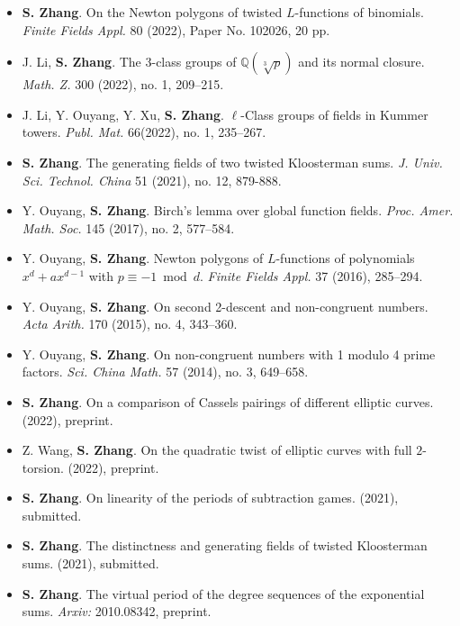 \documentclass[11pt,a4paper]{article}
\begin{document}
\begin{itemize}
\item \textbf{S. Zhang}.
On the Newton polygons of twisted $L$-functions of binomials.
{\em Finite Fields Appl.} 80 (2022), Paper No. 102026, 20 pp.

\item J. Li, \textbf{S. Zhang}.
The $3$-class groups of $\mathbb{Q}(\sqrt[3]{p})$ and its normal closure.
{\em Math. Z.} 300 (2022), no. 1, 209--215.

\item J. Li, Y. Ouyang, Y. Xu, \textbf{S. Zhang}.
$\ell$-Class groups of fields in Kummer towers.
{\em Publ. Mat.} 66(2022), no. 1, 235--267.

\item \textbf{S. Zhang}.
The generating fields of two twisted Kloosterman sums.
{\em J. Univ. Sci. Technol. China} 51 (2021), no. 12, 879-888.

\item Y. Ouyang, \textbf{S. Zhang}.
Birch's lemma over global function fields.
{\em Proc. Amer. Math. Soc.} 145 (2017), no. 2, 577--584.

\item Y. Ouyang, \textbf{S. Zhang}.
Newton polygons of $L$-functions of polynomials $x^d+ax^{d-1}$ with $p\equiv -1 \bmod d$.
{\em Finite Fields Appl.} 37 (2016), 285--294.

\item Y. Ouyang, \textbf{S. Zhang}.
On second 2-descent and non-congruent numbers.
{\em Acta Arith.} 170 (2015), no. 4, 343--360.

\item Y. Ouyang, \textbf{S. Zhang}.
On non-congruent numbers with 1 modulo 4 prime factors.
{\em Sci. China Math.} 57 (2014), no. 3, 649--658.
\end{itemize}


\begin{itemize}
\item \textbf{S. Zhang}.
On a comparison of Cassels pairings of different elliptic curves.
(2022), preprint.

\item Z. Wang, \textbf{S. Zhang}.
On the quadratic twist of elliptic curves with full $2$-torsion.
(2022), preprint.

\item \textbf{S. Zhang}.
On linearity of the periods of subtraction games.
(2021), submitted.

\item \textbf{S. Zhang}.
The distinctness and generating fields of twisted Kloosterman sums.
(2021), submitted.

\item \textbf{S. Zhang}.
The virtual period of the degree sequences of the exponential sums.
{\em Arxiv:} 2010.08342, preprint.
\end{itemize}
\end{document}
